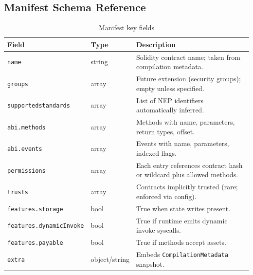\documentclass[11pt]{article}
\begin{document}
\subsection{Manifest Schema Reference}
\begin{table}[H]
\centering
\caption{Manifest key fields}
\begin{tabularx}{\textwidth}{@{}p{}p{}X@{}}
\toprule
Field & Type & Description \\
\midrule
\texttt{name} & string & Solidity contract name; taken from compilation metadata.\\
\texttt{groups} & array & Future extension (security groups); empty unless specified.\\
\texttt{supportedstandards} & array & List of NEP identifiers automatically inferred.\\
\texttt{abi.methods} & array & Methods with name, parameters, return types, offset.\\
\texttt{abi.events} & array & Events with name, parameters, indexed flags.\\
\texttt{permissions} & array & Each entry references contract hash or wildcard plus allowed methods.\\
\texttt{trusts} & array & Contracts implicitly trusted (rare; enforced via config).\\
\texttt{features.storage} & bool & True when state writes present.\\
\texttt{features.dynamicInvoke} & bool & True if runtime emits dynamic invoke syscalls.\\
\texttt{features.payable} & bool & True if methods accept assets.\\
\texttt{extra} & object/string & Embeds \texttt{CompilationMetadata} snapshot.\\
\bottomrule
\end{tabularx}
\end{table}
\end{document}
